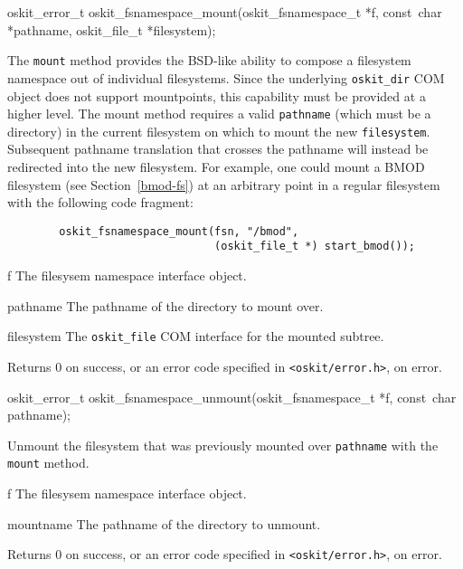 \begin{apisyn}

	\funcproto oskit_error_t
	oskit_fsnamespace_mount(oskit_fsnamespace_t *f,
			const~char *pathname, oskit_file_t *filesystem);
\end{apisyn}
\begin{apidesc}
	The \texttt{mount} method provides the BSD-like ability to compose
	a filesystem namespace out of individual filesystems. Since the
	underlying {\tt oskit_dir} COM object does not support mountpoints,
	this capability must be provided at a higher level. The mount
	method requires a valid \texttt{pathname} (which must be a
	directory) in the current filesystem on which to mount the new
	\texttt{filesystem}. Subsequent pathname translation that crosses
	the pathname will instead be redirected into the new filesystem.
	For example, one could mount a BMOD filesystem (see
	Section~\ref{bmod-fs}) at an arbitrary point in a regular filesystem
	with the following code fragment:
	\begin{codefrag}
	\begin{verbatim}
        oskit_fsnamespace_mount(fsn, "/bmod", 
                                (oskit_file_t *) start_bmod());
        \end{verbatim}
	\end{codefrag}
\end{apidesc}
\begin{apiparm}
	\item[f]
		The \oskit{} filesysem namespace interface object.
	\item[pathname]
		The pathname of the directory to mount over.
	\item[filesystem]
		The {\tt oskit_file} COM interface for the mounted subtree.
\end{apiparm}
\begin{apiret}
	Returns 0 on success, or an error code specified in
	{\tt <oskit/error.h>}, on error.
\end{apiret}


\begin{apisyn}

	\funcproto oskit_error_t
	oskit_fsnamespace_unmount(oskit_fsnamespace_t *f,
			const~char pathname);
\end{apisyn}
\begin{apidesc}
	Unmount the filesystem that was previously mounted over
	\texttt{pathname} with the \texttt{mount} method. 
\end{apidesc}
\begin{apiparm}
	\item[f]
		The \oskit{} filesysem namespace interface object.
	\item[mountname]
		The pathname of the directory to unmount.
\end{apiparm}
\begin{apiret}
	Returns 0 on success, or an error code specified in
	{\tt <oskit/error.h>}, on error.
\end{apiret}


